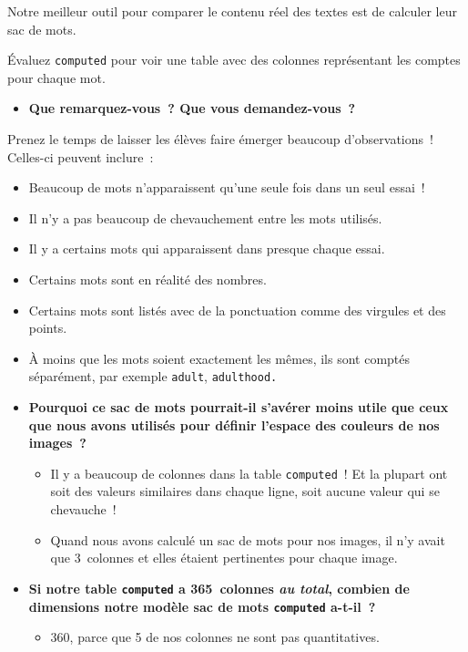 \documentclass[12pt,a4paper]{article}
\begin{document}
\begin{keypointbox}
  Notre meilleur outil pour comparer le contenu réel des textes est de calculer leur sac de mots.

  Évaluez \texttt{computed} pour voir une table avec des colonnes représentant les comptes pour chaque mot.
\end{keypointbox}

\begin{thinkbox}
  \begin{itemize}
    \item \textbf{Que remarquez-vous~? Que vous demandez-vous~?}
  \end{itemize}

  Prenez le temps de laisser les élèves faire émerger beaucoup d'observations~! Celles-ci peuvent inclure~:
  \begin{itemize}
    \item Beaucoup de mots n'apparaissent qu'une seule fois dans un seul essai~!
    \item Il n'y a pas beaucoup de chevauchement entre les mots utilisés.
    \item Il y a certains mots qui apparaissent dans presque chaque essai.
    \item Certains mots sont en réalité des nombres.
    \item Certains mots sont listés avec de la ponctuation comme des virgules et des points.
    \item À moins que les mots soient exactement les mêmes, ils sont comptés séparément, par exemple \texttt{adult}, \texttt{adulthood.}
  \end{itemize}
\end{thinkbox}

\begin{thinkbox}
  \begin{itemize}
    \item \textbf{Pourquoi ce sac de mots pourrait-il s'avérer moins utile que ceux que nous avons utilisés pour définir l'espace des couleurs de nos images~?}
    \begin{itemize}
      \item Il y a beaucoup de colonnes dans la table \texttt{computed}~! Et la plupart ont soit des valeurs similaires dans chaque ligne, soit aucune valeur qui se chevauche~!
      \item Quand nous avons calculé un sac de mots pour nos images, il n'y avait que 3~colonnes et elles étaient pertinentes pour chaque image.
    \end{itemize}
    \item \textbf{Si notre table \texttt{computed} a 365~colonnes \emph{au total}, combien de dimensions notre modèle sac de mots \texttt{computed} a-t-il~?}
    \begin{itemize}
      \item 360, parce que 5 de nos colonnes ne sont pas quantitatives.
    \end{itemize}
  \end{itemize}
\end{thinkbox}
\end{document}

